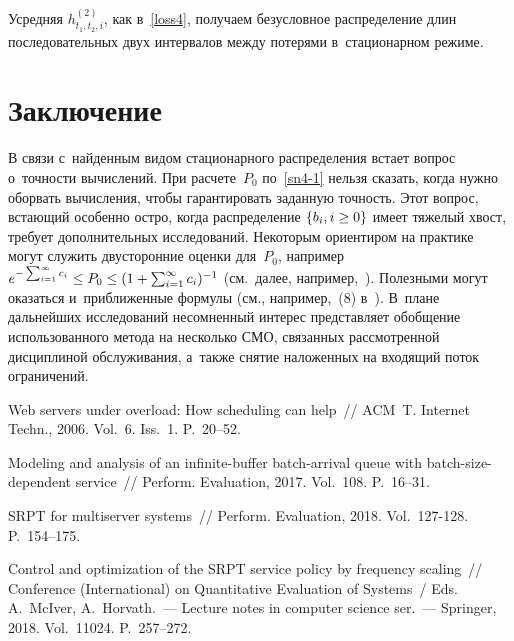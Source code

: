 \begin{multicols}{2}
\vspace*{-2pt}

\noindent Усредняя $h^{(2)}_{t_1,t_2,i}$, как в~\eqref{loss4}, получаем
безусловное распределение длин последовательных двух
интервалов между потерями в~стационарном режиме.

\vspace*{-6pt}

\section{Заключение}

В связи с~найденным видом стационарного распределения встает вопрос 
о~точности вычислений.
При расчете~$P_0$ по~\eqref{sn4-1} нельзя сказать,
когда нужно оборвать вычисления, чтобы гарантировать заданную точность. 
Этот вопрос,
встающий особенно остро, когда распределение
$\{b_i, i \hm\ge 0\}$ имеет тяжелый хвост, требует дополнительных 
исследований.
Некоторым ориентиром на практике могут служить двусторонние
оценки для~$P_0$, например $e^{-\sum\nolimits_{i=1}^\infty c_i} \hm\le 
P_0 \hm\le 
(1+\sum\nolimits_{i=1}^\infty c_i)^{-1}$ (см.\ далее, 
например,~\cite{klam}). Полезными могут оказаться и~приближенные формулы 
(см., например,~(8) в~\cite{i1}). В~плане дальнейших исследований 
несомненный интерес
представляет обобщение использованного метода на несколько СМО, связанных
рассмотренной дисциплиной обслуживания, а~также снятие наложенных
на входящий поток ограничений.

\vspace*{-6pt}


{\small\frenchspacing
 {%
 \begin{thebibliography}{99}

Web servers under overload: How scheduling can help~//
ACM~T. Internet Techn., 2006. Vol.~6. Iss.~1. P.~20--52.

Modeling and analysis of an infinite-buffer batch-arrival
queue with batch-size-dependent service~// Perform. Evaluation, 2017. 
Vol.~108. P.~16--31.

SRPT for multiserver systems~// Perform. Evaluation, 2018. Vol.~127-128. 
P.~154--175.

Control and optimization of the SRPT service policy by frequency 
scaling~// 
Conference (International) on Quantitative Evaluation of Systems~/ Eds. 
A.~McIver, A.~Horvath.~--- Lecture notes in computer science ser.~--- 
Springer, 2018. Vol.~11024. P.~257--272.


\end{thebibliography}}}
\end{multicols}

